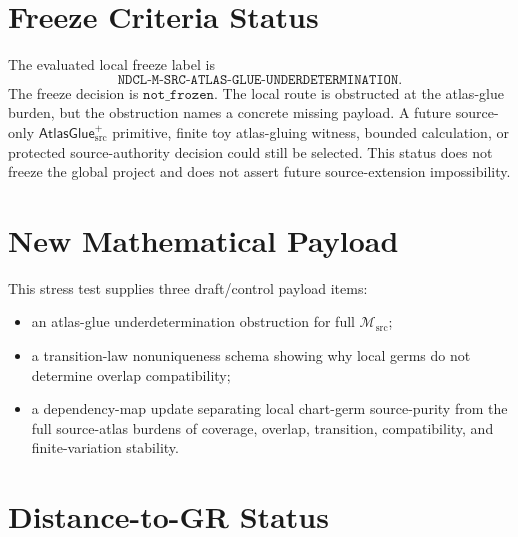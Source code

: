 \documentclass[11pt]{article}
\newcommand{\Msrc}{\mathcal{M}_{\mathrm{src}}}
\newcommand{\AtlasGlue}{\mathsf{AtlasGlue}_{\mathrm{src}}^{+}}
\begin{document}
\section{Freeze Criteria Status}

The evaluated local freeze label is
\[
\texttt{NDCL-M-SRC-ATLAS-GLUE-UNDERDETERMINATION}.
\]
The freeze decision is \(\texttt{not\_frozen}\). The local route is
obstructed at the atlas-glue burden, but the obstruction names a concrete
missing payload. A future source-only \(\AtlasGlue\) primitive, finite toy
atlas-gluing witness, bounded calculation, or protected source-authority
decision could still be selected. This status does not freeze the global
project and does not assert future source-extension impossibility.

\section{New Mathematical Payload}

This stress test supplies three draft/control payload items:
\begin{itemize}
  \item an atlas-glue underdetermination obstruction for full \(\Msrc\);
  \item a transition-law nonuniqueness schema showing why local germs do not
  determine overlap compatibility;
  \item a dependency-map update separating local chart-germ source-purity from
  the full source-atlas burdens of coverage, overlap, transition, compatibility,
  and finite-variation stability.
\end{itemize}

\section{Distance-to-GR Status}
\end{document}
